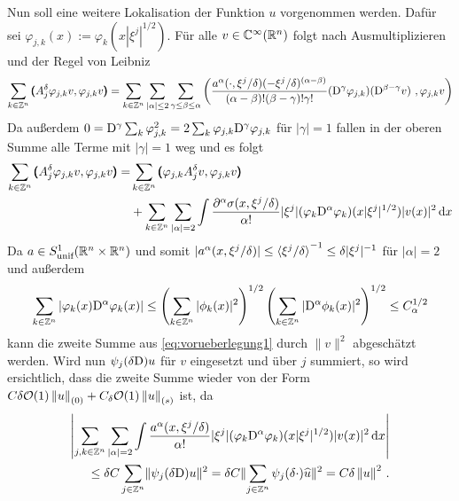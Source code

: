 Nun soll eine weitere Lokalisation der Funktion $u$ vorgenommen werden. Dafür sei $\varphi_{j,k}(x):=\varphi_k(x|\xi^j|^{1/2})$. Für alle $v\in\mathbb C^\infty(\mathbb R^n)$ folgt nach Ausmultiplizieren und der Regel von Leibniz
\begin{align}
\sum_{k\in\Z^n}\spro {A^\delta_j\varphi_{j,k}v} {\varphi_{j,k}v} = \sum_{k\in\Z^n}\sum_{|\alpha|\le 2}\sum_{\gamma\le\beta\le\alpha} \left({\frac{a^\alpha(\cdot,\xi^j/\delta)(-\xi^j/\delta)^{(\alpha-\beta)}}{(\alpha-\beta)!(\beta-\gamma)!\gamma!}(\D^\gamma\varphi_{j,k})(\D^{\beta-\gamma}v)}\ , {\varphi_{j,k}v}\right)
\end{align}
Da außerdem $0=\mathrm D^\gamma\sum_k\varphi_{j,k}^2 = 2 \sum_k\varphi_{j,k}\mathrm D^\gamma\varphi_{j,k}$ für $|\gamma|=1$ fallen in der oberen Summe alle Terme mit $|\gamma|=1$ weg und es folgt
\begin{align}\label{eq:vorueberlegung1}
\begin{split}
\sum_{k\in\mathbb Z^n}\pmb(A^\delta_j\varphi_{j,k}v,\varphi_{j,k}v\pmb) = &\sum_{k\in\mathbb Z^n}\pmb(\varphi_{j,k}A^\delta_jv,\varphi_{j,k}v\pmb) \\&+ \sum_{k\in\mathbb Z^n}\sum_{|\alpha|=2}\int \frac{\partial^\alpha\sigma(x,\xi^j/\delta)}{\alpha!} |\xi^j|(\varphi_k\mathrm D^\alpha\varphi_k)(x|\xi^j|^{1/2})|v(x)|^2\,\mathrm d x
\end{split}
\end{align}
Da $a\in S^1_\text{unif}(\mathbb R^n\times\mathbb R^n)$ und somit $|a^\alpha(x,\xi^j/\delta)|\le\braket{\xi^j/\delta}^{-1}\le \delta|\xi^j|^{-1}$ für $|\alpha|=2$ und außerdem
\begin{align}
\sum_{k\in\mathbb Z^n} |\varphi_k(x)\mathrm D^\alpha\varphi_k(x)|\le \left(\sum_{k\in\mathbb Z^n}|\phi_k(x)|^2\right)^{1/2}\left(\sum_{k\in\mathbb Z^n}|\mathrm D^\alpha\phi_k(x)|^2\right)^{1/2}\le C_\alpha^{1/2}
\end{align}
kann die zweite Summe aus \eqref{eq:vorueberlegung1} durch $\|v\|^2$ abgeschätzt werden. Wird nun $\psi_j(\delta\mathrm D)u$ für $v$ eingesetzt und über $j$ summiert, so wird ersichtlich, dass die zweite Summe wieder von der Form $C\delta \mathcal{O}(1) \left\lVert u\right\rVert_{(0)} + C_\delta \mathcal O(1)\left\lVert u\right\rVert_{(s)}$ ist, da
\begin{align}
\begin{split}
\left|\sum_{j,k\in\mathbb Z^n}\sum_{|\alpha|=2}\int \frac{a^\alpha(x,\xi^j/\delta)}{\alpha!} |\xi^j|(\varphi_k\mathrm D^\alpha\varphi_k)(x|\xi^j|^{1/2})|v(x)|^2\,\mathrm d x\right|\\ \le \delta C \sum_{j\in\mathbb Z^n} \lVert\psi_j(\delta\mathrm D)u\rVert^2 = \delta C \lVert\sum_{j\in\mathbb Z^n} \psi_j(\delta \cdot)\widehat u\rVert^2 = C \delta \left\lVert u\right\rVert ^2\,.
\end{split}
\end{align}

